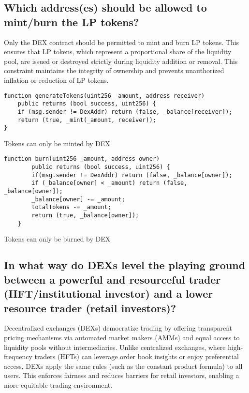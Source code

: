 \documentclass[12pt,a4paper]{article}
\begin{document}
\subsection*{Which address(es) should be allowed to mint/burn the LP tokens?}

Only the DEX contract should be permitted to mint and burn LP tokens. This ensures that LP tokens, which represent a proportional share of the liquidity pool, are issued or destroyed strictly during liquidity addition or removal. This constraint maintains the integrity of ownership and prevents unauthorized inflation or reduction of LP tokens.

\begin{listing}[H]
\begin{verbatim}
function generateTokens(uint256 _amount, address receiver) 
    public returns (bool success, uint256) {
    if (msg.sender != DexAddr) return (false, _balance[receiver]);
    return (true, _mint(_amount, receiver));
}
\end{verbatim}
\caption*{Tokens can only be minted by DEX}
\end{listing}

\begin{listing}[H]
\begin{verbatim}
function burn(uint256 _amount, address owner)
        public returns (bool success, uint256) {
        if(msg.sender != DexAddr) return (false, _balance[owner]);
        if (_balance[owner] < _amount) return (false, _balance[owner]);
        _balance[owner] -= _amount;
        totalTokens -= _amount;
        return (true, _balance[owner]);
    }
\end{verbatim}
\caption*{Tokens can only be burned by DEX}
\end{listing}


\subsection*{In what way do DEXs level the playing ground between a powerful and resourceful trader (HFT/institutional investor) and a lower resource trader (retail investors)?}

Decentralized exchanges (DEXs) democratize trading by offering transparent pricing mechanisms via automated market makers (AMMs) and equal access to liquidity pools without intermediaries. Unlike centralized exchanges, where high-frequency traders (HFTs) can leverage order book insights or enjoy preferential access, DEXs apply the same rules (such as the constant product formula) to all users. This enforces fairness and reduces barriers for retail investors, enabling a more equitable trading environment.
\end{document}
